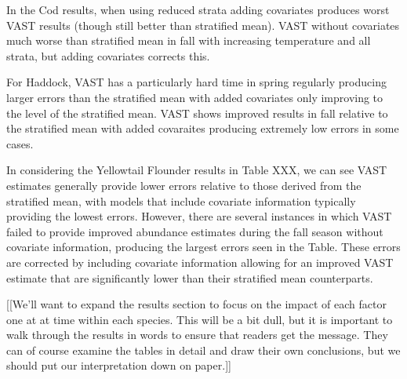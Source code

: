 \documentclass[
  12pt,
]{article}
\begin{document}
In the Cod results, when using reduced strata adding covariates produces worst VAST results (though still better than stratified mean). VAST without covariates much worse than stratified mean in fall with increasing temperature and all strata, but adding covariates corrects this.

For Haddock, VAST has a particularly hard time in spring regularly producing larger errors than the stratified mean with added covariates only improving to the level of the stratified mean. VAST shows improved results in fall relative to the stratified mean with added covaraites producing extremely low errors in some cases.

In considering the Yellowtail Flounder results in Table XXX, we can see VAST estimates generally provide lower errors relative to those derived from the stratified mean, with models that include covariate information typically providing the lowest errors. However, there are several instances in which VAST failed to provide improved abundance estimates during the fall season without covariate information, producing the largest errors seen in the Table. These errors are corrected by including covariate information allowing for an improved VAST estimate that are significantly lower than their stratified mean counterparts.

{[}{[}We'll want to expand the results section to focus on the impact of each factor one at at time within each species. This will be a bit dull, but it is important to walk through the results in words to ensure that readers get the message. They can of course examine the tables in detail and draw their own conclusions, but we should put our interpretation down on paper.{]}{]}
\end{document}
